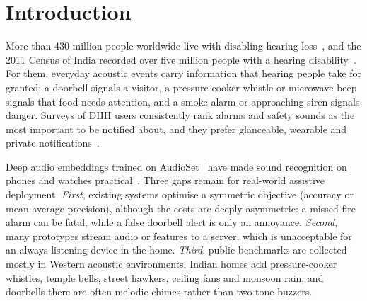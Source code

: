 \documentclass[conference]{IEEEtran}
\begin{document}
\section{Introduction}
More than 430 million people worldwide live with disabling hearing loss~\cite{who2021}, and the 2011 Census of India recorded over five million people with a hearing disability~\cite{census2011}. For them, everyday acoustic events carry information that hearing people take for granted: a doorbell signals a visitor, a pressure-cooker whistle or microwave beep signals that food needs attention, and a smoke alarm or approaching siren signals danger. Surveys of DHH users consistently rank alarms and safety sounds as the most important to be notified about, and they prefer glanceable, wearable and private notifications~\cite{findlater2019,bragg2016}.

Deep audio embeddings trained on AudioSet~\cite{gemmeke2017} have made sound recognition on phones and watches practical~\cite{laput2018,jain2020soundwatch,jain2020homesound,jain2022protosound}. Three gaps remain for real-world assistive deployment. \emph{First}, existing systems optimise a symmetric objective (accuracy or mean average precision), although the costs are deeply asymmetric: a missed fire alarm can be fatal, while a false doorbell alert is only an annoyance. \emph{Second}, many prototypes stream audio or features to a server, which is unacceptable for an always-listening device in the home. \emph{Third}, public benchmarks are collected mostly in Western acoustic environments. Indian homes add pressure-cooker whistles, temple bells, street hawkers, ceiling fans and monsoon rain, and doorbells there are often melodic chimes rather than two-tone buzzers.
\end{document}
